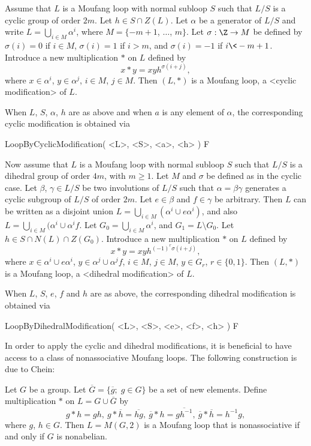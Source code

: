 Assume that $L$ is a Moufang loop with normal subloop $S$ such that $L/S$ is a
cyclic group of order $2m$. Let $h\in S\cap Z(L)$. Let $\alpha$ be a generator
of $L/S$ and write $L = \bigcup_{i\in M} \alpha^i$, where $M=\{-m+1$, $\dots$,
$m\}$. Let $\sigma:\Z\to M$ be defined by $\sigma(i)=0$ if $i\in M$,
$\sigma(i)=1$ if $i>m$, and $\sigma(i)=-1$ if $i\<-m+1$. Introduce a new
multiplication $\ast$ on $L$ defined by
$$
    x\ast y = xyh^{\sigma(i+j)},
$$
where $x\in \alpha^i$, $y\in\alpha^j$, $i\in M$, $j\in M$. Then $(L,\ast)$ is a
Moufang loop, a <cyclic modification> of $L$.

When $L$, $S$, $\alpha$, $h$ are as above and when $a$ is any element of
$\alpha$, the corresponding cyclic modification is obtained via

\>LoopByCyclicModification( <L>, <S>, <a>, <h> ) F

Now assume that $L$ is a Moufang loop with normal subloop $S$ such that $L/S$
is a dihedral group of order $4m$, with $m\ge 1$. Let $M$ and $\sigma$ be
defined as in the cyclic case. Let $\beta$, $\gamma\in L/S$ be two involutions
of $L/S$ such that $\alpha=\beta\gamma$ generates a cyclic subgroup of $L/S$ of
order $2m$. Let $e\in\beta$ and $f\in\gamma$ be arbitrary. Then $L$ can be
written as a disjoint union $L=\bigcup_{i\in M}(\alpha^i\cup e\alpha^i)$, and
also $L=\bigcup_{i\in M}(\alpha^i\cup \alpha^if$. Let $G_0=\bigcup_{i\in
M}\alpha^i$, and $G_1=L\setminus G_0$. Let $h\in S\cap N(L)\cap Z(G_0)$.
Introduce a new multiplication $\ast$ on $L$ defined by
$$
    x\ast y = xyh^{(-1)^r\sigma(i+j)},
$$
where $x\in\alpha^i\cup e\alpha^i$, $y\in\alpha^j\cup \alpha^jf$, $i\in M$,
$j\in M$, $y\in G_r$, $r\in\{0,1\}$. Then $(L,\ast)$ is a Moufang loop, a
<dihedral modification> of $L$.

When $L$, $S$, $e$, $f$ and $h$ are as above, the corresponding dihedral
modification is obtained via

\>LoopByDihedralModification( <L>, <S>, <e>, <f>, <h> ) F

In order to apply the cyclic and dihedral modifications, it is beneficial to
have access to a class of nonassociative Moufang loops. The following
construction is due to Chein:

Let $G$ be a group. Let $\overline{G}=\{\overline{g};\;g\in G\}$ be a set of
new elements. Define multiplication $\ast$ on $L=G\cup \overline{G}$ by
$$
    g\ast h = gh,\ g\ast\overline{h}=\overline{hg},\
    \overline{g}\ast h = \overline{gh^{-1}},\
    \overline{g}\ast \overline{h}=h^{-1}g,
$$
where $g$, $h\in G$. Then $L=M(G,2)$ is a Moufang loop that is nonassociative
if and only if $G$ is nonabelian.

